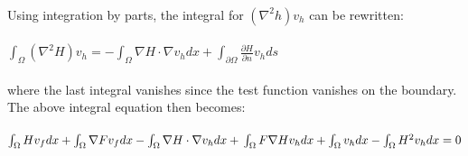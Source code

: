 \documentclass[a4paper,english,11pt,twoside]{article}
\begin{document}
\\
Using integration by parts, the integral for $(\nabla^2 h) v_h$ can be rewritten:\\
\\
$\int_{\Omega}(\nabla^2 H) v_h = - \int_{\Omega}\nabla H \cdot \nabla v_hdx + \int_{\partial\Omega}\frac{\partial H}{\partial n}v_hds$\\
\\
where the last integral vanishes since the test function vanishes on the boundary. The above integral equation then becomes:\\
\\
$\int_{\Omega}Hv_fdx + \int_{\Omega}\nabla F v_fdx - \int_{\Omega}\nabla H\cdot\nabla v_hdx + \\
\\
\int_{\Omega} F \nabla H v_hdx + \int_{\Omega}v_hdx - \int_{\Omega}H^2v_hdx = 0$\\
\end{document}
